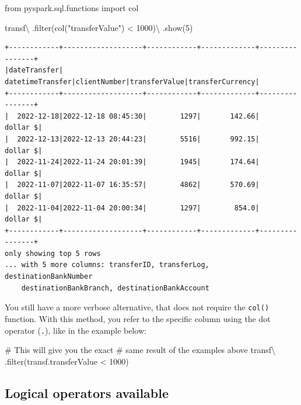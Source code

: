\documentclass[
  11pt,
  letterpaper,
  DIV=11,
  numbers=noendperiod]{scrreprt}
\newenvironment{Shaded}{\begin{snugshade}}{\end{snugshade}}
\newcommand{\BuiltInTok}[1]{\textcolor[rgb]{0.00,0.23,0.31}{#1}}
\newcommand{\CommentTok}[1]{\textcolor[rgb]{0.37,0.37,0.37}{#1}}
\newcommand{\DecValTok}[1]{\textcolor[rgb]{0.68,0.00,0.00}{#1}}
\newcommand{\ImportTok}[1]{\textcolor[rgb]{0.00,0.46,0.62}{#1}}
\newcommand{\NormalTok}[1]{\textcolor[rgb]{0.00,0.23,0.31}{#1}}
\newcommand{\OperatorTok}[1]{\textcolor[rgb]{0.37,0.37,0.37}{#1}}
\newcommand{\StringTok}[1]{\textcolor[rgb]{0.13,0.47,0.30}{#1}}
\begin{document}
\begin{Shaded}
\begin{Highlighting}[]
\ImportTok{from}\NormalTok{ pyspark.sql.functions }\ImportTok{import}\NormalTok{ col}

\NormalTok{transf}\OperatorTok{\textbackslash{}}
\NormalTok{  .}\BuiltInTok{filter}\NormalTok{(col(}\StringTok{"transferValue"}\NormalTok{) }\OperatorTok{\textless{}} \DecValTok{1000}\NormalTok{)}\OperatorTok{\textbackslash{}}
\NormalTok{  .show(}\DecValTok{5}\NormalTok{)}
\end{Highlighting}
\end{Shaded}

\begin{verbatim}
+------------+-------------------+------------+-------------+----------------+
|dateTransfer|   datetimeTransfer|clientNumber|transferValue|transferCurrency|
+------------+-------------------+------------+-------------+----------------+
|  2022-12-18|2022-12-18 08:45:30|        1297|       142.66|        dollar $|
|  2022-12-13|2022-12-13 20:44:23|        5516|       992.15|        dollar $|
|  2022-11-24|2022-11-24 20:01:39|        1945|       174.64|        dollar $|
|  2022-11-07|2022-11-07 16:35:57|        4862|       570.69|        dollar $|
|  2022-11-04|2022-11-04 20:00:34|        1297|        854.0|        dollar $|
+------------+-------------------+------------+-------------+----------------+
only showing top 5 rows
... with 5 more columns: transferID, transferLog, destinationBankNumber
    destinationBankBranch, destinationBankAccount
\end{verbatim}

You still have a more verbose alternative, that does not require the
\texttt{col()} function. With this method, you refer to the specific
column using the dot operator (\texttt{.}), like in the example below:

\begin{Shaded}
\begin{Highlighting}[]
\CommentTok{\# This will give you the exact}
\CommentTok{\# same result of the examples above}
\NormalTok{transf}\OperatorTok{\textbackslash{}}
\NormalTok{  .}\BuiltInTok{filter}\NormalTok{(transf.transferValue }\OperatorTok{\textless{}} \DecValTok{1000}\NormalTok{)}
\end{Highlighting}
\end{Shaded}

\hypertarget{logical-operators-available}{%
\subsection{Logical operators
available}\label{logical-operators-available}}
\end{document}

